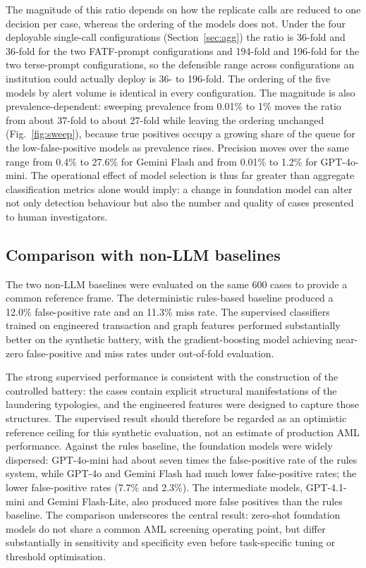 \documentclass[pdflatex,sn-basic,Numbered]{sn-jnl}
\newcommand{\HLtext}[1]{\texthl{#1}}
\newcommand{\HLdel}[1]{\textcolor{HLink}{\sout{#1}}}
\renewcommand{\HLtext}[1]{#1}\renewcommand{\HLdel}[1]{#1}%
\begin{document}
\HLtext{The magnitude of this ratio depends on how the replicate calls are reduced to one decision per case, whereas the ordering of the models does not. Under the four deployable single-call configurations} (Section~\ref{sec:agg}\HLtext{) the ratio is 36-fold and 36-fold for the two FATF-prompt configurations and 194-fold and 196-fold for the two terse-prompt configurations, so the defensible range across configurations an institution could actually deploy is 36- to 196-fold. The ordering of the five models by alert volume is identical in every configuration. The magnitude is also prevalence-dependent: sweeping prevalence from 0.01}\% \HLtext{to 1}\% \HLtext{moves the ratio from about 37-fold to about 27-fold while leaving the ordering unchanged} (Fig.~\ref{fig:sweep}\HLtext{), because true positives occupy a growing share of the queue for the low-false-positive models as prevalence rises. Precision moves over the same range from 0.4}\% \HLtext{to 27.6}\% \HLtext{for Gemini Flash and from 0.01}\% \HLtext{to 1.2}\% \HLtext{for GPT-4o-mini.} The operational effect of model selection is thus far greater than aggregate classification metrics alone would imply: a change in foundation model can alter not only detection behaviour but also the number and quality of cases presented to human investigators.

\subsection{Comparison with non-LLM baselines}\label{sec:baselines}

The two non-LLM baselines were evaluated on the same 600 cases to provide a common reference frame. The deterministic rules-based baseline produced a 12.0\% false-positive rate and an 11.3\% miss rate. The supervised classifiers trained on engineered transaction and graph features performed substantially better on the synthetic battery, with the gradient-boosting model achieving near-zero false-positive and miss rates under out-of-fold evaluation.

The strong supervised performance is consistent with the construction of the controlled battery: the cases contain explicit structural manifestations of the laundering typologies, and the engineered features were designed to capture those structures. The supervised result should therefore be regarded as an optimistic reference ceiling for this synthetic evaluation, not an estimate of production AML performance. Against the rules baseline, the foundation models were widely dispersed: GPT-4o-mini had about seven times the false-positive rate of the rules system, while GPT-4o and Gemini Flash had \HLdel{much lower false-positive rates; the} \HLtext{lower false-positive rates (7.7}\% \HLtext{and 2.3}\%\HLtext{). The} intermediate models, GPT-4.1-mini and Gemini Flash-Lite, also produced more false positives than the rules baseline. The comparison underscores the central result: zero-shot foundation models do not share a common AML screening operating point, but differ substantially in sensitivity and specificity even before task-specific tuning or threshold optimisation.
\end{document}
